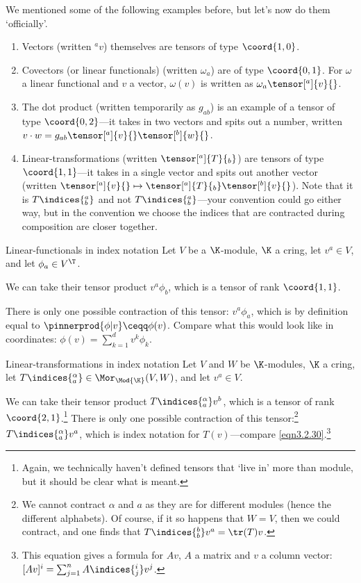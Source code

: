We mentioned some of the following examples before, but let's now do them `officially'.
\begin{exm}{}{}
	\begin{enumerate}
		\item Vectors (written $^av$) themselves are tensors of type $\coord{1,0}$.
		\item Covectors (or linear functionals) (written $\omega _a$) are of type $\coord{0,1}$.  For $\omega$ a linear functional and $v$ a vector, $\omega (v)$ is written as $\omega _a\tensor[^a]{v}{}$.
		\item The dot product (written temporarily as $g_{ab}$) is an example of a tensor of type $\coord{0,2}$---it takes in two vectors and spits out a number, written $v\cdot w=g_{ab}\tensor[^a]{v}{}\tensor[^b]{w}{}$.
		\item Linear-transformations (written $\tensor[^a]{T}{_b}$) are tensors of type $\coord{1,1}$---it takes in a single vector and spits out another vector (written $\tensor[^a]{v}{}\mapsto \tensor[^a]{T}{_b}\tensor[^b]{v}{}$).  Note that it is $T\indices{^a_b}$ and not $T\indices{_b^a}$---your convention could go either way, but in the convention we choose the indices that are contracted during composition are closer together.
	\end{enumerate}
\end{exm}
\begin{exm}{Linear-functionals in index notation}{}
	Let $V$ be a $\K$-module, $\K$ a cring, let $v^a\in V$, and let $\phi _a\in V^{\T}$.
	
	We can take their tensor product $v^a\phi _b$, which is a tensor of rank $\coord{1,1}$.
	
	There is only one possible contraction of this tensor:   $v^a\phi _a$, which is by definition equal to $\pinnerprod{\phi |v}\ceqq \phi (v)$.    Compare what this would look like in coordinates:  $\phi (v)=\sum _{k=1}^dv^k\phi _k$.
\end{exm}
\begin{exm}{Linear-transformations in index notation}{}
	Let $V$ and $W$ be $\K$-modules, $\K$ a cring, let $T\indices{^{\alpha}_a}\in \Mor _{\Mod{\K}}(V,W)$, and let $v^a\in V$.
	
	We can take their tensor product $T\indices{^{\alpha}_a}v^b$, which is a tensor of rank $\coord{2,1}$.\footnote{Again, we technically haven't defined tensors that `live in' more than module, but it should be clear what is meant.}  There is only one possible contraction of this tensor:\footnote{We cannot contract $\alpha$ and $a$ as they are for different modules (hence the different alphabets).  Of course, if it so happens that $W=V$, then we could contract, and one finds that $T\indices{^b_b}v^a=\tr (T)v$.}  $T\indices{^{\alpha}_a}v^a$, which is index notation for $T(v)$---compare \eqref{eqn3.2.30}.\footnote{This equation gives a formula for $Av$, $A$ a matrix and $v$ a column vector:  $[Av]^i=\sum _{j=1}^nA\indices{^i_j}v^j$.}
\end{exm}
